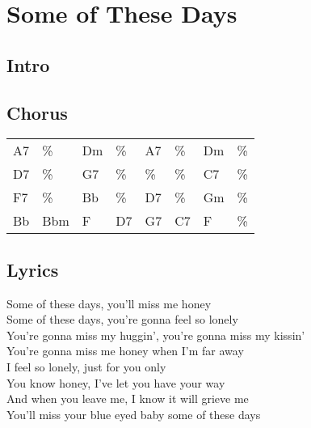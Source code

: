 \section{Some of These Days}


\subsection*{Intro}


\subsection*{Chorus}


\begin{tabular}{l l l l l l l l}
A7 & \% & Dm & \% & A7 & \% & Dm & \% \\ 
D7 & \% & G7 & \% & \% & \% & C7 & \% \\ 
F7 & \% & Bb & \% & D7 & \% & Gm & \% \\ 
Bb & Bbm & F & D7 & G7 & C7 & F & \% \\ 
\end{tabular}


\subsection*{Lyrics}


Some of these days, you'll miss me honey \\ 
Some of these days, you're gonna feel so lonely \\ 
You're gonna miss my huggin', you're gonna miss my kissin' \\ 
You're gonna miss me honey when I'm far away \\ 

I feel so lonely, just for you only \\ 
You know honey, I've let you have your way \\ 
And when you leave me, I know it will grieve me \\ 
You'll miss your blue eyed baby some of these days \\ 
